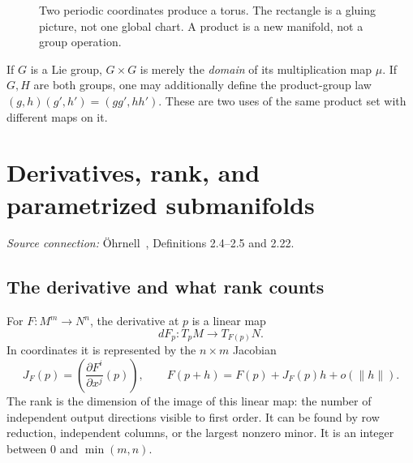 \documentclass[11pt,a4paper]{article}
\numberwithin{equation}{section}
\theoremstyle{definition}
\theoremstyle{plain}
\theoremstyle{remark}
\newcommand{\source}[1]{\textit{Source connection:} \"Ohrnell~\cite{ohrnell}, #1.}
\begin{document}
\begin{figure}[htbp]\centering
{}
\caption{Two periodic coordinates produce a torus. The rectangle is a gluing picture, not one global chart. A product is a new manifold, not a group operation.}
\end{figure}
If $G$ is a Lie group, $G\times G$ is merely the \emph{domain} of its multiplication map $\mu$. If $G,H$ are both groups, one may additionally define the product-group law $(g,h)(g',h')=(gg',hh')$. These are two uses of the same product set with different maps on it.

\section{Derivatives, rank, and parametrized submanifolds}\label{sec:maps}
\source{Definitions 2.4--2.5 and 2.22}
\subsection{The derivative and what rank counts}\label{sec:rank}
For $F:M^m\to N^n$, the derivative at $p$ is a linear map
\[
dF_p:T_pM\longrightarrow T_{F(p)}N.
\]
In coordinates it is represented by the $n\times m$ Jacobian
\[
J_F(p)=\left(\frac{\partial F^i}{\partial x^j}(p)\right),\qquad
F(p+h)=F(p)+J_F(p)h+o(\|h\|).
\]
The rank is the dimension of the image of this linear map: the number of independent output directions visible to first order. It can be found by row reduction, independent columns, or the largest nonzero minor. It is an integer between $0$ and $\min(m,n)$.
\end{document}

